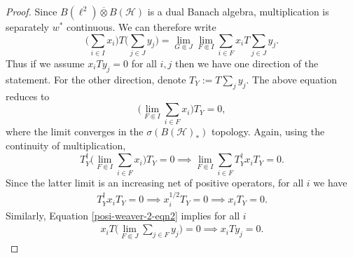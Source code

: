 \documentclass[10pt,a4paper]{amsart}
\newcommand{\mc}[1]{\mathcal{#1}}
\begin{document}
\begin{proof}
    Since $B(\ell^2) \overline{\otimes} B(\mc H)$ is a dual Banach algebra, multiplication is separately $w^*$ continuous. We can therefore write
    \[
    \bigg(\sum_{i \in I} x_i\bigg) T \bigg(\sum_{j \in J} y_j\bigg) = \lim_{G \Subset J}\lim_{F \Subset I} \sum_{i \in F} x_i T \sum_{j \in J}y_j.
    \]
    Thus if we assume $x_i T y_j = 0$ for all $i,j$ then we have one direction of the statement. For the other direction, denote $T_Y := T\sum_j y_j$. The above equation reduces to
    \[
    \bigg(\lim_{F \Subset I} \sum_{i \in F} x_i\bigg) T_Y= 0,
    \]
    where the limit converges in the $\sigma(B(\mc H)_*)$ topology. Again, using the continuity of multiplication,
    \[
     T_Y^\dagger\bigg( \lim_{F \Subset I} \sum_{i \in F} x_i \bigg)T_Y = 0 \implies  \lim_{F \Subset I} \sum_{i \in F} T_Y^\dagger x_iT_Y = 0.
    \]
    Since the latter limit is an increasing net of positive operators, for all $i$ we have
    \begin{align} \label{posi-weaver-2-eqn2}
    T_Y^\dagger x_iT_Y = 0 \implies x_i^{1/2}T_Y = 0 \implies x_i T_Y = 0.
    \end{align}
    Similarly, Equation \ref{posi-weaver-2-eqn2} implies for all $i$
    \begin{align} \label{posi-weaver-2-eqn3}
    x_iT\bigg( \lim_{F \Subset J} \sum_{j \in F} y_j \bigg) = 0 \implies x_iTy_j = 0.
    \end{align}
\end{proof}
\end{document}
